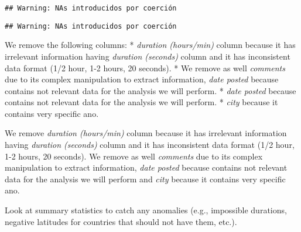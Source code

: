 \documentclass[
]{article}
\newenvironment{Shaded}{\begin{snugshade}}{\end{snugshade}}
\newcommand{\AttributeTok}[1]{\textcolor[rgb]{0.13,0.29,0.53}{#1}}
\newcommand{\ConstantTok}[1]{\textcolor[rgb]{0.56,0.35,0.01}{#1}}
\newcommand{\FunctionTok}[1]{\textcolor[rgb]{0.13,0.29,0.53}{\textbf{#1}}}
\newcommand{\NormalTok}[1]{#1}
\newcommand{\OtherTok}[1]{\textcolor[rgb]{0.56,0.35,0.01}{#1}}
\newcommand{\SpecialCharTok}[1]{\textcolor[rgb]{0.81,0.36,0.00}{\textbf{#1}}}
\newcommand{\StringTok}[1]{\textcolor[rgb]{0.31,0.60,0.02}{#1}}
\begin{document}
\begin{verbatim}
## Warning: NAs introducidos por coerción
\end{verbatim}

\begin{Shaded}
\end{Shaded}

\begin{verbatim}
## Warning: NAs introducidos por coerción
\end{verbatim}

We remove the following columns: * \emph{duration (hours/min)} column
because it has irrelevant information having \emph{duration (seconds)}
column and it has inconsistent data format (1/2 hour, 1-2 hours, 20
seconds). * We remove as well \emph{comments} due to its complex
manipulation to extract information, \emph{date posted} because contains
not relevant data for the analysis we will perform. * \emph{date posted}
because contains not relevant data for the analysis we will perform. *
\emph{city} because it contains very specific ano.

We remove \emph{duration (hours/min)} column because it has irrelevant
information having \emph{duration (seconds)} column and it has
inconsistent data format (1/2 hour, 1-2 hours, 20 seconds). We remove as
well \emph{comments} due to its complex manipulation to extract
information, \emph{date posted} because contains not relevant data for
the analysis we will perform and \emph{city} because it contains very
specific ano.

\begin{Shaded}
\end{Shaded}

Look at summary statistics to catch any anomalies (e.g., impossible
durations, negative latitudes for countries that should not have them,
etc.).
\end{document}
